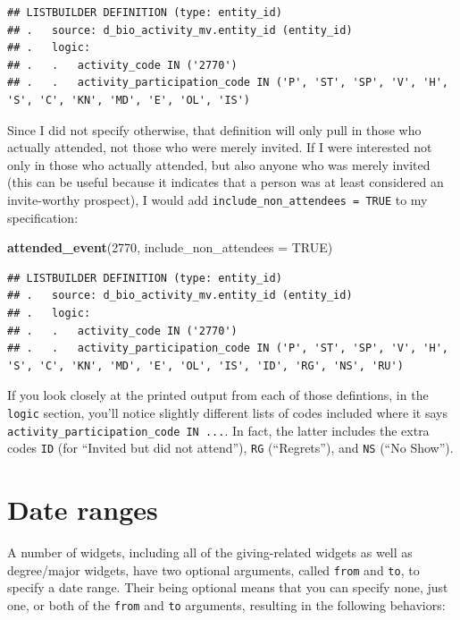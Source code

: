 \documentclass[]{book}
\newenvironment{Shaded}{\begin{snugshade}}{\end{snugshade}}
\newcommand{\DataTypeTok}[1]{\textcolor[rgb]{0.13,0.29,0.53}{#1}}
\newcommand{\DecValTok}[1]{\textcolor[rgb]{0.00,0.00,0.81}{#1}}
\newcommand{\KeywordTok}[1]{\textcolor[rgb]{0.13,0.29,0.53}{\textbf{#1}}}
\newcommand{\NormalTok}[1]{#1}
\newcommand{\OtherTok}[1]{\textcolor[rgb]{0.56,0.35,0.01}{#1}}
\begin{document}
\begin{verbatim}
## LISTBUILDER DEFINITION (type: entity_id)
## .   source: d_bio_activity_mv.entity_id (entity_id)
## .   logic: 
## .   .   activity_code IN ('2770')
## .   .   activity_participation_code IN ('P', 'ST', 'SP', 'V', 'H', 'S', 'C', 'KN', 'MD', 'E', 'OL', 'IS')
\end{verbatim}

Since I did not specify otherwise, that definition will only pull in those who actually attended, not those who were merely invited. If I were interested not only in those who actually attended, but also anyone who was merely invited (this can be useful because it indicates that a person was at least considered an invite-worthy prospect), I would add \texttt{include\_non\_attendees\ =\ TRUE} to my specification:

\begin{Shaded}
\begin{Highlighting}[]
\KeywordTok{attended_event}\NormalTok{(}\DecValTok{2770}\NormalTok{, }\DataTypeTok{include_non_attendees =} \OtherTok{TRUE}\NormalTok{)}
\end{Highlighting}
\end{Shaded}

\begin{verbatim}
## LISTBUILDER DEFINITION (type: entity_id)
## .   source: d_bio_activity_mv.entity_id (entity_id)
## .   logic: 
## .   .   activity_code IN ('2770')
## .   .   activity_participation_code IN ('P', 'ST', 'SP', 'V', 'H', 'S', 'C', 'KN', 'MD', 'E', 'OL', 'IS', 'ID', 'RG', 'NS', 'RU')
\end{verbatim}

If you look closely at the printed output from each of those defintions, in the \texttt{logic} section, you'll notice slightly different lists of codes included where it says \texttt{activity\_participation\_code\ IN\ ...}. In fact, the latter includes the extra codes \texttt{ID} (for ``Invited but did not attend''), \texttt{RG} (``Regrets''), and \texttt{NS} (``No Show'').

\hypertarget{date-ranges}{%
\section{Date ranges}\label{date-ranges}}

A number of widgets, including all of the giving-related widgets as well as degree/major widgets, have two optional arguments, called \texttt{from} and \texttt{to}, to specify a date range. Their being optional means that you can specify none, just one, or both of the \texttt{from} and \texttt{to} arguments, resulting in the following behaviors:
\end{document}
